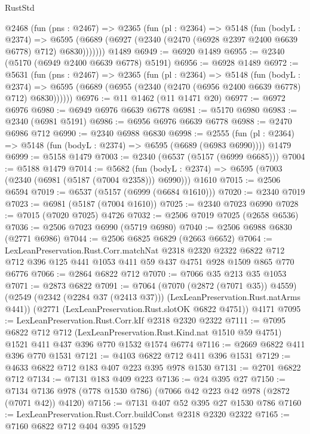 \begin{lexlean}{RustStd}
\begin{coremodule}
    @2468
      (fun (pns : @2467) =>
      @2365
        (fun (pl : @2364) =>
        @5148
          (fun (bodyL : @2374) =>
          @6595 (@6689 (@6927 (@2340 (@2470 (@6928 @2397 @2400 @6639 @6778) @712) @6830)))))))
    @1489
@6949 := @6920 @1489
@6955 := @2340 (@5170 (@6949 @2400 @6639 @6778) @5191)
@6956 := @6928 @1489
@6972 := @5631
    (fun (pns : @2467) =>
    @2365
      (fun (pl : @2364) =>
      @5148
        (fun (bodyL : @2374) =>
        @6595 (@6689 (@6955 (@2340 (@2470 (@6956 @2400 @6639 @6778) @712) @6830))))))
@6976 := @11 @1462 (@11 @1471 @20)
@6977 := @6972 @6976
@6980 := @6949 @6976 @6639 @6778
@6981 := @5170 @6980
@6983 := @2340 (@6981 @5191)
@6986 := @6956 @6976 @6639 @6778
@6988 := @2470 @6986 @712
@6990 := @2340 @6988 @6830
@6998 := @2555
    (fun (pl : @2364) => @5148 (fun (bodyL : @2374) => @6595 (@6689 (@6983 @6990))))
    @1479
@6999 := @5158 @1479
@7003 := @2340 (@6537 (@5157 (@6999 @6685)))
@7004 := @5188 @1479
@7014 := @5682
    (fun (bodyL : @2374) => @6595 (@7003 (@2340 (@6981 (@5187 (@7004 @2358))) @6990)))
    @1610
@7015 := @2506 @6594
@7019 := @6537 (@5157 (@6999 (@6684 @1610)))
@7020 := @2340 @7019
@7023 := @6981 (@5187 (@7004 @1610))
@7025 := @2340 @7023 @6990
@7028 := @7015 (@7020 @7025) @4726
@7032 := @2506 @7019 @7025 (@2658 @6536)
@7036 := @2506 @7023 @6990 (@5719 @6980)
@7040 := @2506 @6988 @6830 (@2771 @6986)
@7044 := @2506 @6825 @6829 (@2663 @6652)
@7064 := LexLeanPreservation.Rust.Corr.matchNat
    @2318
    @2320
    @2322
    @6822
    @712
    @712
    @396
    @125
    @441
    @1053
    @411
    @59
    @437
    @4751
    @928
    @1509
    @865
    @770
    @6776
@7066 := @2864 @6822 @712
@7070 := @7066 @35 @213 @35 @1053
@7071 := @2873 @6822
@7091 := @7064
    (@7070 (@2872 (@7071 @35)) @4559)
    (@2549 (@2342 (@2284 @37 (@2413 @37))) (LexLeanPreservation.Rust.natArms @441))
    (@2771 (LexLeanPreservation.Rust.slotOK @6822 @4751))
    @4171
@7095 := LexLeanPreservation.Rust.Corr.kIf @2318 @2320 @2322
@7111 := @7095
    @6822
    @712
    @712
    (LexLeanPreservation.Rust.Kind.nat @1510 @59 @4751)
    @1521
    @411
    @437
    @396
    @770
    @1532
    @1574
    @6774
@7116 := @2669 @6822 @411 @396 @770 @1531
@7121 := @4103 @6822 @712 @411 @396 @1531
@7129 := @4633 @6822 @712 @183 @407 @223 @395 @978 @1530
@7131 := @2701 @6822 @712
@7134 := @7131 @183 @409 @223
@7136 := @24 @395 @27
@7150 := @7134 @7136 @978 (@778 @1530 @786) (@7066 @42 @223 @42 @978 (@2872 (@7071 @42)) @4120)
@7156 := @7131 @407 @52 @395 @27 @1530 @786
@7160 := LexLeanPreservation.Rust.Corr.buildConst @2318 @2320 @2322
@7165 := @7160 @6822 @712 @404 @395 @1529

\end{coremodule}
\end{lexlean}
